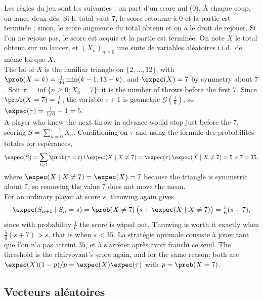 \begin{example}
  Les règles du jeu sont les suivantes : on part d'un score nul ($0$). À chaque
  coup, on lance deux dés. Si le total vaut $7$, le score retourne à $0$ et la
  partie est terminée ; sinon, le score augmente du total obtenu et on a le droit
  de rejouer. Si l'on ne rejoue pas, le score est acquis et la partie est
  terminée. On note $X$ le total obtenu sur un lancer, et $(X_{n})_{n \ge 0}$ une
  suite de variables aléatoires i.i.d.\ de même loi que $X$.\\

  The loi of $X$ is the familiar triangle on $\{2,\dots,12\}$, with
  $\prob(X = k) = \tfrac{1}{36}\min(k-1, 13-k)$, and $\expec(X) = 7$ by symmetry
  about $7$. Soit $\tau = \inf\{n \ge 0 : X_{n} = 7\}$: it is the number of
  throws before the first $7$. Since $\prob(X = 7) = \tfrac16$, the variable
  $\tau + 1$ is geometric $\mathcal{G}(\tfrac16)$, so
  $\expec(\tau) = \tfrac{1}{1/6} - 1 = 5$.\\

  A player who knew the next throw in advance would stop just before the $7$,
  scoring $S = \sum_{n=0}^{\tau - 1} X_{n}$. Conditioning on $\tau$ and using the
  formule des probabilités totales for espérances,
  \[ \expec(S) = \sum_{t \ge 1} \prob(\tau = t)\, t\, \expec(X \mid X \ne 7)
       = \expec(\tau)\, \expec(X \mid X \ne 7) = 5 \times 7 = 35, \]
  where $\expec(X \mid X \ne 7) = \expec(X) = 7$ because the triangle is
  symmetric about $7$, so removing the value $7$ does not move the mean.\\

  For an ordinary player at score $s$, throwing again gives
  \[ \expec(S_{n+1} \mid S_{n} = s)
       = \prob(X \ne 7)\,\big( s + \expec(X \mid X \ne 7) \big)
       = \tfrac56 (s + 7), \]
  since with probability $\tfrac16$ the score is wiped out. Throwing is worth it
  exactly when $\tfrac56(s+7) > s$, that is when $s < 35$. La stratégie optimale
  consiste à jouer tant que l'on n'a pas atteint $35$, et à s'arrêter après avoir
  franchi ce seuil. The threshold is the clairvoyant's score again, and for the
  same reason: both are $\expec(X)(1-p)/p = \expec(X)\expec(\tau)$ with
  $p = \prob(X = 7)$.
\end{example}

\subsection{Vecteurs aléatoires}


